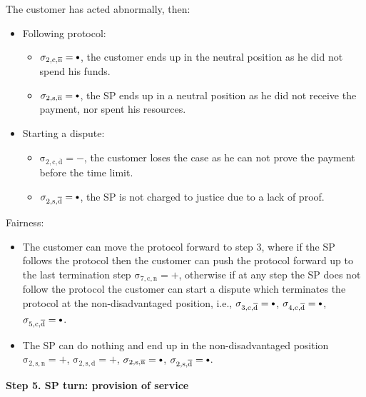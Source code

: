 \documentclass{ieeeaccess}
\newcommand\neutral[1][.75]{\mathbin{\ThisStyle{\vcenter{\hbox{%
  \scalebox{#1}{$\SavedStyle\bullet$}}}}}%
}
\begin{document}
The customer has acted abnormally, then:

\begin{itemize}
\item
  Following protocol:
  \begin{itemize}
  \item
    \(\operatorname{\sigma_{2, c, \overline{n}} = \neutral}\), the customer ends up in the neutral position as he did not spend his funds.
  \item
    \(\operatorname{\sigma_{2, s, \overline{n}} = \neutral}\), the SP ends up in a neutral position as he did not receive the payment, nor spent his resources.
  \end{itemize}
\item
  Starting a dispute:

  \begin{itemize}
  
  \item
    \(\operatorname{\sigma_{2, c, \overline{d}} = -}\), the customer loses the case as he can not prove the payment before the time limit.
  \item
    \(\operatorname{\sigma_{2, s, \overline{d}} = \neutral}\), the SP is not charged to justice due to a lack of proof.
  \end{itemize}
\end{itemize}

Fairness:

\begin{itemize}

\item
  The customer can move the protocol forward to step 3, where if the SP follows the protocol then the customer can push the protocol forward up to the last termination step \(\operatorname{\sigma_{7, c, n} = +}\), otherwise if at any step the SP does not follow the protocol the customer can start a dispute which terminates the protocol at the non-disadvantaged position, i.e., \(\operatorname{\sigma_{3, c, \overline{d}} = \neutral}\), \(\operatorname{\sigma_{4, c, \overline{d}} = \neutral}\), \(\operatorname{\sigma_{5, c, \overline{d}} = \neutral}\).
\item
  The SP can do nothing and end up in the non-disadvantaged position \(\operatorname{\sigma_{2, s, n} = +}\), \(\operatorname{\sigma_{2, s, d} = +}\), \(\operatorname{\sigma_{2, s, \overline{n}} = \neutral}\), \(\operatorname{\sigma_{2, s, \overline{d}} = \neutral}\).
\end{itemize}

\noindent \textbf
{Step 5. SP turn: provision of service}
\end{document}
